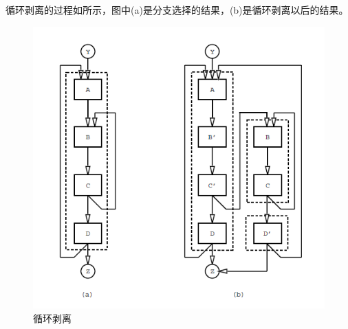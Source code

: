 循环剥离的过程如所示，图中(a)是分支选择的结果，(b)是循环剥离以后的结果。
\begin{figure}
\includegraphics[width=\linewidth]{hyperblock-lp}
\caption{\label{fig:looppeeling} 循环剥离}
\end{figure}
